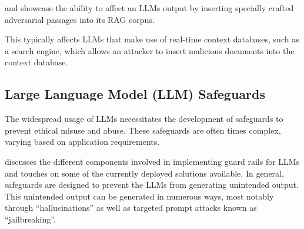 \autocite{tan2024gluepizzaeatrocks} and \autocite{xue2024badragidentifyingvulnerabilitiesretrieval} showcase the ability to affect an LLMs output by inserting specially crafted adversarial passages into its RAG corpus.

This typically affects LLMs that make use of real-time context databases, such as a search engine, which allows an attacker to insert malicious documents into the context database.

\subsection{Large Language Model (LLM) Safeguards}
The widespread usage of LLMs necessitates the development of safeguards to prevent ethical misuse and abuse.
These safeguards are often times complex, varying based on application requirements.

\autocite{dong2024buildingguardrailslargelanguage} discusses the different components involved in implementing guard rails for LLMs and touches on some of the currently deployed solutions available.
In general, safeguards are designed to prevent the LLMs from generating unintended output.
This unintended output can be generated in numerous ways, most notably through ``hallucinations'' as well as targeted prompt attacks known as ``jailbreaking''.
